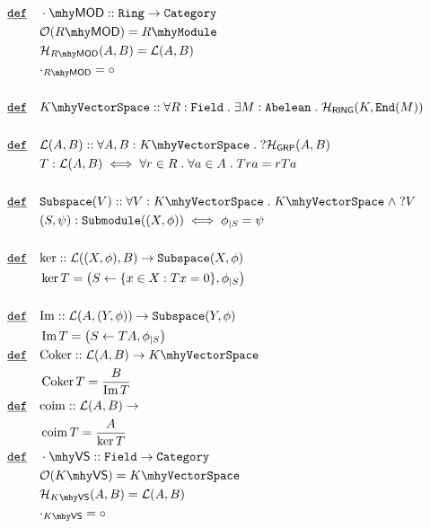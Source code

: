 \documentclass[12pt]{article}
\DeclareMathOperator*{\im}{\mathrm{Im}}
\DeclareMathOperator*{\coker}{\mathrm{Coker}}
\DeclareMathOperator*{\coim}{\mathrm{coim}}
\renewcommand{\.}{\; . \;}
\newcommand{\De}{\underline{\mathtt{def}} \quad}
\newcommand{\module}[1]{{#1} \mhy \mathtt{Module}}
\newcommand{\submodule}[1]{\mathtt{Submodule}(#1)}
\newcommand{\linear}[1]{\mathcal{L}(#1)}
\newcommand{\Morph}[3]{\mathcal{H}_{#1}(#2,#3)}
\newcommand{\Obj}[1]{\mathcal{O}(#1)}
\newcommand{\ring}{\mathtt{Ring}}
\newcommand{\RING}{\mathsf{RING}}
\newcommand{\GRP}{\mathsf{GRP} }
\newcommand{\MOD}[1]{#1 \mhy \mathsf{MOD} }
\newcommand{\VS}[1]{#1 \mhy \mathsf{VS} }
\newcommand{\End}{\mathtt{End}}
\newcommand{\vs}[1]{#1 \mhy \mathtt{VectorSpace}}
\newcommand{\subspace}[1]{\mathtt{Subspace}(#1)}
\newcommand{\cat}{\mathtt{Category} }
\newcommand{\abel}{\mathtt{Abelean}}
\newcommand{\field}{\mathtt{Field}}
\begin{document}
\begin{align*}
\De & \MOD{\cdot} :: \ring \to \cat \\
	& \Obj{\MOD{R}} = \module{R} \\
	& \Morph{\MOD{R}}{A}{B} = \linear{A,B} \\
	& \cdot_{\MOD{R}} = \circ \\ \\
\De & \vs{K} :: \forall R :  \field \. \exists M : \abel \. \Morph{\RING}{K}{\End(M)} \\
\\ 
\De & \linear{A,B} :: \forall A,B : \vs{K} \. ? \Morph{\GRP}{A}{B} \\
	&  T : \linear{A,B} \iff \forall r \in R \. \forall a \in A \. Tra = rTa \\
	\\
\De & \subspace{V} :: \forall V : \vs{K} \. \vs{K} \; \wedge \; ?V \\
	& (S, \psi) : \submodule{(X,\phi)} \iff   \phi_{\vert S} = \psi \\ \\
\De & {\ker} ::	 \linear{(X,\phi),B} \to \subspace{X,\phi} \\
	& \ker T = \big( S \leftarrow \{ x \in X : Tx = 0  \}, \phi_{\vert S} \big) \\ \\
\De & {\im} ::	 \linear{ A,(Y,\phi)} \to \subspace{Y,\phi} \\
	& \im T = \big( S \leftarrow TA, \phi_{\vert S} \big) \\ \
\De & {\coker} :: \linear{A, B} \to \vs{K} \\
	& \coker T = \frac{B}{\im T} \\
\De & {\coim} :: \linear{A, B} \to \ \\
	& \coim T = \frac{A}{\ker T} \\
\De & \VS{\cdot} :: \field \to \cat \\
	& \Obj{\VS{K}} = \vs{K} \\
	& \Morph{\VS{K}}{A}{B} = \linear{A,B} \\
	& \cdot_{\VS{K}} = \circ \\ \\
\end{align*} 
\newpage
\end{document}
